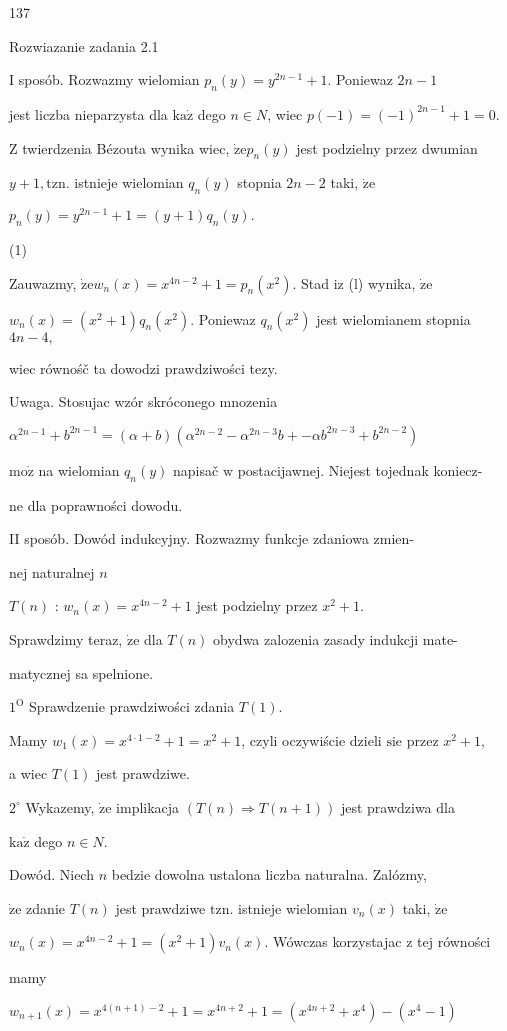 \documentclass[a4paper,12pt]{article}
\begin{document}
137

Rozwiazanie zadania 2.1

I sposób. Rozwazmy wielomian $p_{n}(y) =y^{2n-1}+1$. Poniewaz $2n-1$

jest liczba nieparzysta dla $\mathrm{k}\mathrm{a}\dot{\mathrm{z}}$ dego $n\in N$, wiec $p(-1)=(-1)^{2n-1}+1=0.$

$\mathrm{Z}$ twierdzenia Bézouta wynika wiec, $\dot{\mathrm{z}}\mathrm{e}p_{n}(y)$ jest podzielny przez dwumian

$y+1, \mathrm{t}\mathrm{z}\mathrm{n}$. istnieje wielomian $q_{n}(y)$ stopnia $2n-2$ taki, $\dot{\mathrm{z}}\mathrm{e}$

$p_{n}(y)=y^{2n-1}+1=(y+1)q_{n}(y).$

(1)

Zauwazmy, $\dot{\mathrm{z}}\mathrm{e} w_{n}(x) = x^{4n-2}+1 =p_{n}(x^{2})$. Stad $\mathrm{i} \mathrm{z}$ (l) wynika, $\dot{\mathrm{z}}\mathrm{e}$

$w_{n}(x)=(x^{2}+1)q_{n}(x^{2})$. Poniewaz $q_{n}(x^{2})$ jest wielomianem stopnia $4n-4,$

wiec równośč ta dowodzi prawdziwości tezy.

Uwaga. Stosujac wzór skróconego mnozenia

$\alpha^{2n-1}+b^{2n-1}=(\alpha+b)(\alpha^{2n-2}-\alpha^{2n-3}b+-\alpha b^{2n-3}+b^{2n-2})$

$\mathrm{m}\mathrm{o}\dot{\mathrm{z}}$ na wielomian $q_{n}(y)$ napisač $\mathrm{w}$ postacijawnej. Niejest tojednak koniecz-

ne dla poprawności dowodu.

II sposób. Dowód indukcyjny. Rozwazmy funkcje zdaniowa zmien-

nej naturalnej $n$

$T(n)$ : $w_{n}(x)=x^{4n-2}+1$ jest podzielny przez $x^{2}+1.$

Sprawdzimy teraz, $\dot{\mathrm{z}}\mathrm{e}$ dla $T(n)$ obydwa zalozenia zasady indukcji mate-

matycznej sa spelnione.

$1^{\mathrm{O}}$ Sprawdzenie prawdziwości zdania $T(1).$

Mamy $w_{1}(x)=x^{4\cdot 1-2}+1=x^{2}+1$, czyli oczywiście dzieli $\mathrm{s}\mathrm{i}\mathrm{e}$ przez $x^{2}+1,$

a wiec $T(1)$ jest prawdziwe.

$2^{\circ}$ Wykazemy, $\dot{\mathrm{z}}\mathrm{e}$ implikacja $(T(n)\Rightarrow T(n+1))$ jest prawdziwa dla

$\mathrm{k}\mathrm{a}\dot{\mathrm{z}}$ dego $n\in N.$

Dowód. Niech $n$ bedzie dowolna ustalona liczba naturalna. Zalózmy,

$\dot{\mathrm{z}}\mathrm{e}$ zdanie $T(n)$ jest prawdziwe $\mathrm{t}\mathrm{z}\mathrm{n}$. istnieje wielomian $v_{n}(x)$ taki, $\dot{\mathrm{z}}\mathrm{e}$

$w_{n}(x) =x^{4n-2}+1 = (x^{2}+1)v_{n}(x)$. Wówczas korzystajac $\mathrm{z}$ tej równości

mamy

$w_{n+1}(x)=x^{4(n+1)-2}+1=x^{4n+2}+1=(x^{4n+2}+x^{4})-(x^{4}-1)$
\end{document}
